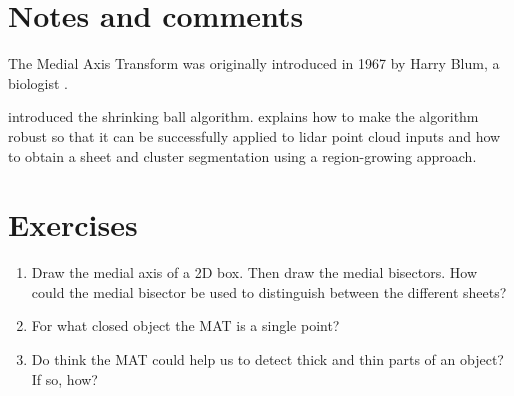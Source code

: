 
\section{Notes and comments}
The Medial Axis Transform was originally introduced in 1967 by Harry Blum, a biologist \citep{Blum67}.

\citet{Ma12} introduced the shrinking ball algorithm. \citet{Peters18} explains how to make the algorithm robust so that it can be successfully applied to lidar point cloud inputs and how to obtain a sheet and cluster segmentation using a region-growing approach.


%
\section{Exercises}

\begin{enumerate}
  \item Draw the medial axis of a 2D box. Then draw the medial bisectors. How could the medial bisector be used to distinguish between the different sheets?
  \item For what closed object the MAT is a single point?
  \item Do think the MAT could help us to detect thick and thin parts of an object? If so, how?
\end{enumerate}